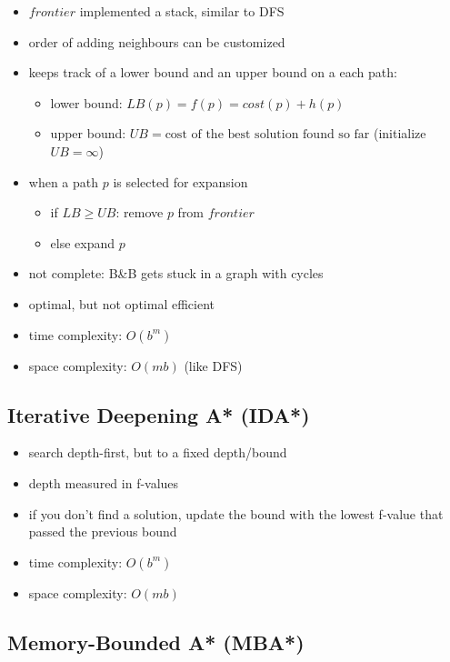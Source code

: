\documentclass{article}
\begin{document}
\begin{itemize}
    \item $frontier$ implemented a stack, similar to DFS
    \item order of adding neighbours can be customized
    \item keeps track of a lower bound and an upper bound on a each path:
        \begin{itemize}
            \item lower bound: $LB(p) = f(p) = cost(p) + h(p)$
            \item upper bound: $UB = \text{cost of the best solution found so far}$ (initialize $UB = \infty$)
        \end{itemize}
    \item when a path $p$ is selected for expansion
        \begin{itemize}
            \item if $LB \geq UB$: remove $p$ from $frontier$
            \item else expand $p$
        \end{itemize}
    \item not complete: B\&B gets stuck in a graph with cycles
    \item optimal, but not optimal efficient
    \item time complexity: $O(b^m)$
    \item space complexity: $O(mb)$ (like DFS)
\end{itemize}

\subsection{Iterative Deepening A* (IDA*)}

\begin{itemize}
    \item search depth-first, but to a fixed depth/bound
    \item depth measured in f-values
    \item if you don't find a solution, update the bound with the lowest f-value that passed the previous bound
    \item time complexity: $O(b^m)$
    \item space complexity: $O(mb)$
\end{itemize}

\subsection{Memory-Bounded A* (MBA*)}
\end{document}
